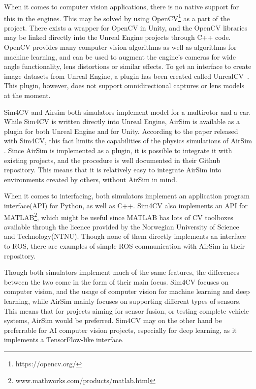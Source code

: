 When it comes to computer vision applications, there is no native support for this in the engines. This may be solved by using OpenCV\footnote{https://opencv.org/} as a part of the project. There exists a wrapper for OpenCV in Unity, and the OpenCV libraries may be linked directly into the Unreal Engine projects through C++ code. OpenCV provides many computer vision algorithms as well as algorithms for machine learning, and can be used to augment the engine's cameras for wide angle functionality, lens distortions or similar effects. To get an interface to create image datasets from Unreal Engine, a plugin has been created called UnrealCV~\cite{UnrealCV}. This plugin, however, does not support omnidirectional captures or lens models at the moment.

Sim4CV and Airsim both simulators implement model for a multirotor and a car. While Sim4CV is written directly into Unreal Engine, AirSim is available as a plugin for both Unreal Engine and for Unity. According to the paper released with Sim4CV, this fact limits the capabilities of the physics simulations of AirSim \cite{Sim4CV_paper}. Since AirSim is implemented as a plugin, it is possible to integrate it with existing projects, and the procedure is well documented in their Github repository. This means that it is relatively easy to integrate AirSim into environments created by others, without AirSim in mind. 

When it comes to interfacing, both simulators implement an application program interface(API) for Python, as well as C++. Sim4CV also implements an API for MATLAB\footnote{www.mathworks.com/products/matlab.html}, which might be useful since MATLAB has lots of CV toolboxes available through the licence provided by the Norwegian University of Science and Technology(NTNU). Though none of them directly implements an interface to ROS, there are examples of simple ROS communication with AirSim in their repository.

Though both simulators implement much of the same features, the differences between the two come in the form of their main focus. Sim4CV focuses on computer vision, and the usage of computer vision for machine learning and deep learning, while AirSim mainly focuses on supporting different types of sensors. This means that for projects aiming for sensor fusion, or testing complete vehicle systems, AirSim would be preferred. Sim4CV may on the other hand be preferrable for AI computer vision projects, especially for deep learning, as it implements a TensorFlow-like interface.

